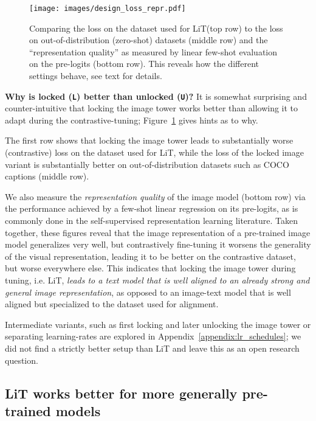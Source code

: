 \documentclass[10pt,twocolumn,letterpaper]{article}
\makeatletter
\def \lit {LiT\xspace}
\renewcommand*{\ie}{i.e.\@\xspace}
\makeatother
\begin{document}
\begin{figure}[t]
    \centering
    \texttt{[image: images/design\_loss\_repr.pdf]}
    \caption{Comparing the loss on the dataset used for \protect\lit (top row) to the loss on out-of-distribution (zero-shot) datasets (middle row) and the “representation quality” as measured by linear few-shot evaluation on the pre-logits (bottom row).
    This reveals how the different settings behave, see text for details.}
    \label{fig:design_loss_repr}
\end{figure}

\textbf{Why is locked ({\tt \textbf{L}}) better than unlocked ({\tt \textbf{U}})?} It is somewhat surprising and counter-intuitive that locking the image tower works better than allowing it to adapt during the contrastive-tuning; Figure~\ref{fig:design_loss_repr} gives hints as to why.

The first row shows that locking the image tower leads to substantially worse (contrastive) loss on the dataset used for \lit, while the loss of the locked image variant is substantially better on out-of-distribution datasets such as COCO captions (middle row).

We also measure the \emph{representation quality} of the image model (bottom row) via the performance achieved by a few-shot linear regression on its pre-logits, as is commonly done in the self-supervised representation learning literature.
Taken together, these figures reveal that the image representation of a pre-trained image model generalizes very well, but contrastively fine-tuning it worsens the generality of the visual representation, leading it to be better on the contrastive dataset, but worse everywhere else.
This indicates that locking the image tower during tuning, \ie \lit, \emph{leads to a text model that is well aligned to an already strong and general image representation}, as opposed to an image-text model that is well aligned but specialized to the dataset used for alignment.

Intermediate variants, such as first locking and later unlocking the image tower or separating learning-rates are explored in Appendix~\ref{appendix:lr_schedules}; we did not find a strictly better setup than \lit and leave this as an open research question.



\subsection{\protect\lit works better for more generally pre-trained models}
\label{sec:more_image_pretrainings}
\end{document}
